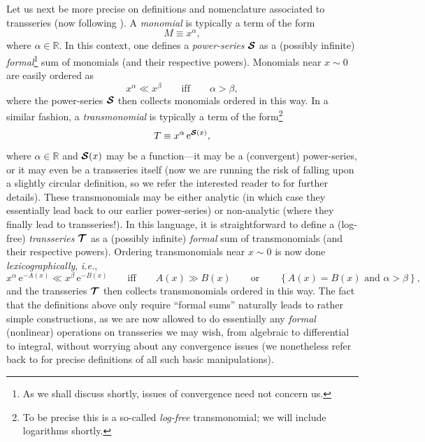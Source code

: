 \documentclass[11pt,a4paper]{article}
\newcommand{\CS}{{\cal S}}
\newcommand{\CT}{{\cal T}}
\def\BR{{\mathbb R}}
\newcommand{\be}{\begin{equation}}
\newcommand{\ee}{\end{equation}}
\newcommand{\rme}{{\mathrm{e}}}
\begin{document}
Let us next be more precise on definitions and nomenclature associated to transseries (now following \cite{e08}). A \textit{monomial} is typically a term of the form
%
\be
M \equiv x^\alpha,
\ee
%
\noindent
where $\alpha \in \BR$. In this context, one defines a \textit{power-series} $\boldsymbol{\CS}$ as a (possibly infinite) \textit{formal}\footnote{As we shall discuss shortly, issues of convergence need not concern us.} sum of monomials (and their respective powers). Monomials near $x \sim 0$ are easily ordered as
%
\be
x^\alpha \ll x^\beta \qquad \text{iff} \qquad \alpha > \beta,
\ee
%
\noindent
where the power-series $\boldsymbol{\CS}$ then collects monomials ordered in this way. In a similar fashion, a \textit{transmonomial} is typically a  term of the form\footnote{To be precise this is a so-called \textit{log-free} transmonomial; we will include logarithms shortly.}
%
\be
T \equiv x^{\alpha}\, \rme^{\boldsymbol{\CS}(x)},
\ee
%
\noindent
where $\alpha \in \BR$ and $\boldsymbol{\CS}(x)$ may be a function---it may be a (convergent) power-series, or it may even be a transseries itself (now we are running the risk of falling upon a slightly circular definition, so we refer the interested reader to \cite{e08} for further details). These transmonomials may be either analytic (in which case they essentially lead back to our earlier power-series) or non-analytic (where they finally lead to transseries!). In this language, it is straightforward to define a (log-free) \textit{transseries} $\boldsymbol{\CT}$ as a (possibly infinite) \textit{formal} sum of transmonomials (and their respective powers). Ordering transmonomials near $x \sim 0$ is now done \textit{lexicographically}, \textit{i.e.},
%
\be
x^{\alpha}\, \rme^{- A(x)} \ll x^{\beta}\, \rme^{- B(x)} \qquad \text{iff} \qquad A(x) \gg B(x) \qquad \text{or} \qquad \left\{ A(x) = B(x) \text{ and } \alpha > \beta \right\},
\ee
%
\noindent
and the transseries $\boldsymbol{\CT}$ then collects transmonomials ordered in this way. The fact that the definitions above only require ``formal sums'' naturally leads to rather simple constructions, as we are now allowed to do essentially any \textit{formal} (nonlinear) operations on transseries we may wish, from algebraic to differential to integral, without worrying about any convergence issues (we nonetheless refer back to \cite{e08} for precise definitions of all such basic manipulations).
\end{document}
